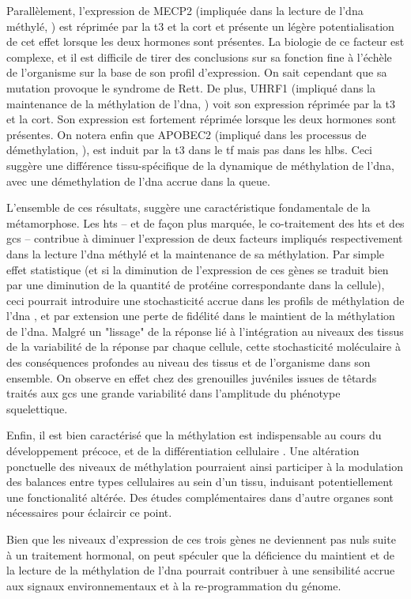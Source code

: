 \documentclass[../main.tex]{subfiles}
\begin{document}
Parallèlement, l'expression de MECP2 (impliquée dans la lecture de l'\gls{dna} méthylé, \citealp{Zou2012}) est réprimée par la \gls{t3} et la \gls{cort} et présente un légère potentialisation de cet effet lorsque les deux hormones sont présentes.
La biologie de ce facteur est complexe, et il est difficile de tirer des conclusions sur sa fonction fine à l'échèle de l'organisme sur la base de son profil d'expression.
On sait cependant que sa mutation provoque le syndrome de Rett.
De plus, UHRF1 (impliqué dans la maintenance de la méthylation de l'\gls{dna}, \citealp{Bostick2007,Liu2013a}) voit son expression réprimée par la \gls{t3} et la \gls{cort}.
Son expression est fortement réprimée lorsque les deux hormones sont présentes.
On notera enfin que APOBEC2 (impliqué dans les processus de démethylation, \citealp{Guo2011}), est induit par la \gls{t3} dans le \gls{tf} mais pas dans les \glspl{hlb}.
Ceci suggère une différence tissu-spécifique de la dynamique de méthylation de l'\gls{dna}, avec une démethylation de l'\gls{dna} accrue dans la queue.
\par
L'ensemble de ces résultats, suggère une caractéristique fondamentale de la métamorphose.
Les \glspl{ht} – et de façon plus marquée, le co-traitement des \glspl{ht} et des \glspl{gc} – contribue à diminuer l'expression de deux facteurs impliqués respectivement dans la lecture l'\gls{dna} méthylé et la maintenance de sa méthylation.
Par simple effet statistique (et si la diminution de l'expression de ces gènes se traduit bien par une diminution de la quantité de protéine correspondante dans la cellule), ceci pourrait introduire une stochasticité accrue dans les profils de méthylation de l'\gls{dna} \cite{Xie2011,Landan2012}, et par extension une perte de fidélité dans le maintient de la méthylation de l'\gls{dna}.
Malgré un "lissage" de la réponse lié à l'intégration au niveaux des tissus de la variabilité de la réponse par chaque cellule, cette stochasticité moléculaire à des conséquences profondes au niveau des tissus et de l'organisme dans son ensemble.
On observe en effet chez des grenouilles juvéniles issues de têtards traités aux \glspl{gc} une grande variabilité dans l'amplitude du phénotype squelettique.
\par
Enfin, il est bien caractérisé que la méthylation est indispensable au cours du développement précoce, et de la différentiation cellulaire \citep{Monk1987,Meissner2008}.
Une altération ponctuelle des niveaux de méthylation pourraient ainsi participer à la modulation des balances entre types cellulaires au sein d'un tissu, induisant potentiellement une fonctionalité altérée.
Des études complémentaires dans d'autre organes sont nécessaires pour éclaircir ce point.
\par
Bien que les niveaux d'expression de ces trois gènes ne deviennent pas nuls suite à un traitement hormonal, on peut spéculer que la déficience du maintient et de la lecture de la méthylation de l'\gls{dna} pourrait contribuer à une sensibilité accrue aux signaux environnementaux et à la re-programmation du génome.
\end{document}
